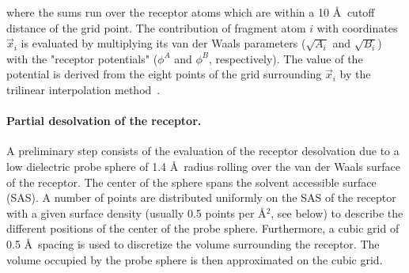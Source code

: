 \documentclass[a4paper,12pt,titlepage]{article}
\begin{document}
where the sums run over the receptor atoms which are within a 10 \AA $\:$ 
cutoff distance of the grid point. The contribution of fragment atom $i$ with
coordinates
$\vec{x}_i$ is evaluated by multiplying its van der Waals parameters 
($\sqrt{A_i}$ and $\sqrt{B_i}$) with the 
"receptor potentials"  ($\phi^A$ and $\phi^B$, respectively).
The value of the potential is
derived from the eight points of the grid surrounding $\vec{x}_i$ by the 
trilinear interpolation method~\cite{Press:Numerical}.

\paragraph{Partial desolvation of the receptor.}

A preliminary step consists of the evaluation of the receptor desolvation 
due to a low dielectric probe sphere of 1.4 \AA\ radius rolling over the
van der Waals surface of the receptor. 
The center of the sphere spans the solvent accessible surface 
(SAS). A number of points are distributed uniformly on 
the SAS of the receptor with a given surface density (usually 0.5 points 
per \AA$^2$, see below) 
to describe the different positions of the center of the 
probe sphere.  Furthermore, a cubic grid of 0.5 \AA~spacing 
is used to discretize the volume surrounding the receptor.  The volume
occupied by the probe sphere is then approximated on the cubic grid.
\end{document}
